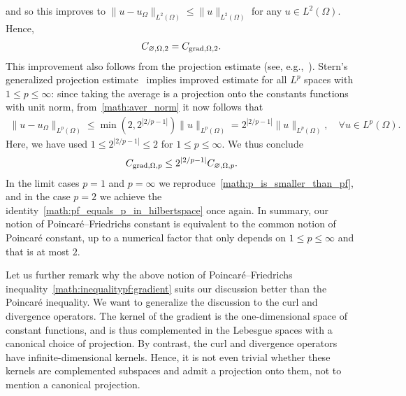 \documentclass[10pt,a4paper]{article}
\begin{document}
and so this improves to $\| u - u_\Omega \|_{L^{2}(\Omega)} \leq \| u \|_{L^{2}(\Omega)}$ for any $u \in L^{2}(\Omega)$. 
Hence,
\begin{align}\label{math:pf_equals_p_in_hilbertspace}
    C_{\varnothing,\Omega,2} = C_{\operatorname{grad},\Omega,2}. 
\end{align}
This improvement also follows from the projection estimate (see, e.g.,~\cite{xu2003some}).
Stern's generalized projection estimate~\cite[Theorem~4.1,Remark~5.1]{stern2015banach} implies improved estimate for all $L^{p}$ spaces with $1 \leq p \leq \infty$:
since taking the average is a projection onto the constants functions with unit norm, from~\eqref{math:aver_norm} it now follows that 
\begin{align*}
    \| u - u_\Omega \|_{L^{p}(\Omega)}
    \leq 
    \min\left( 2, 2^{|2/p-1|} \right)
    \| u \|_{L^{p}(\Omega)}
    = 
    2^{|2/p-1|} 
    \| u \|_{L^{p}(\Omega)}
    ,
    \quad 
    \forall 
    u \in L^{p}(\Omega)
    .
\end{align*}
Here, we have used $1 \leq 2^{|2/p-1|} \leq 2$ for $1 \leq p \leq \infty$.
We thus conclude 
\begin{align}\label{math:p_vs_pf}
    C_{\operatorname{grad},\Omega,p} \leq 2^{|2/p-1|} C_{\varnothing,\Omega,p}.
\end{align}
In the limit cases $p = 1$ and $p = \infty$ we reproduce~\eqref{math:p_is_smaller_than_pf}, 
and in the case $p = 2$ we achieve the identity~\eqref{math:pf_equals_p_in_hilbertspace} once again.
In summary, our notion of Poincar\'e--Friedrichs constant is equivalent to the common notion of Poincar\'e constant, up to a numerical factor that only depends on $1 \leq p \leq \infty$ and that is at most $2$.

\begin{remark}
    Let us further remark why the above notion of Poincar\'e--Friedrichs inequality~\eqref{math:inequalitypf:gradient} suits our discussion better than the Poincar\'e inequality. 
    We want to generalize the discussion to the curl and divergence operators. 
    The kernel of the gradient is the one-dimensional space of constant functions, and is thus complemented in the Lebesgue spaces with a canonical choice of projection. 
    By contrast, the curl and divergence operators have infinite-dimensional kernels. 
    Hence, it is not even trivial whether these kernels are complemented subspaces and admit a projection onto them, not to mention a canonical projection. 
\end{remark}
\end{document}
